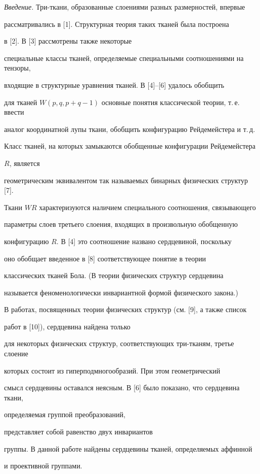 {\it Введение.} Три-ткани, образованные слоениями разных размерностей, впервые


рассматривались в [1]. Структурная теория таких тканей была построена


в [2]. В [3] рассмотрены также некоторые


специальные классы тканей, определяемые специальными соотношениями на тензоры,


входящие в структурные уравнения тканей. В [4]--[6] удалось обобщить


для тканей $W(p,q,p+q-1)$ основные понятия классической теории, т.\,е. ввести


аналог координатной лупы ткани, обобщить конфигурацию Рейдемейстера и т.\,д.


Класс тканей, на которых замыкаются обобщенные конфигурации Рейдемейстера


$R$, является


геометрическим эквивалентом так называемых бинарных физических структур [7].


Ткани $WR$ характеризуются наличием специального соотношения, связывающего


параметры слоев третьего слоения, входящих в произвольную  обобщенную


конфигурацию $R$. В [4] это соотношение названо сердцевиной, поскольку


оно обобщает введенное в [8] соответствующее понятие в теории


классических тканей Бола. (В теории физических структур сердцевина


называется феноменологически инвариантной формой физического закона.)


В работах, посвященных теории физических структур (см. [9], а также список


работ в [10]), сердцевина найдена только


для некоторых физических структур, соответствующих три-тканям, третье слоение


которых состоит из гиперподмногообразий. При этом геометрический


смысл сердцевины оставался неясным. В [6] было показано, что сердцевина ткани,


определяемая группой преобразований, 


представляет собой равенство двух инвариантов


группы. В данной работе найдены сердцевины тканей, определяемых аффинной


и проективной группами.


